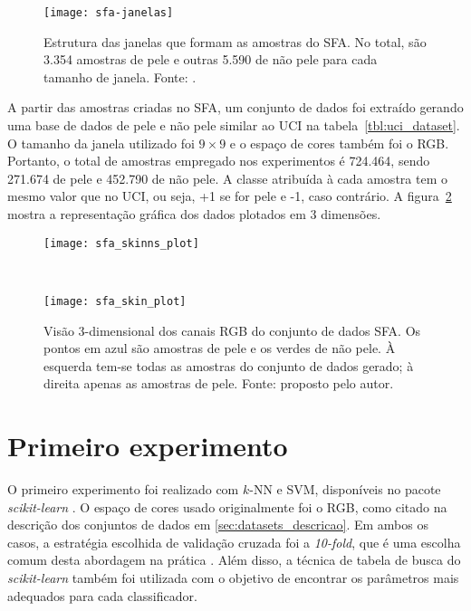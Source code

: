 \begin{figure}[h]
  \centering
  \texttt{[image: sfa-janelas]}
  \caption[Estrutura das janelas que formam as amostras do SFA]{Estrutura das janelas que formam as amostras do SFA. No total, são 3.354 amostras de pele e outras 5.590 de não pele para cada tamanho de janela. Fonte: \citet{sfa-skin-dataset:13}.}
  \label{fig:sfa_dataset_janelas}
\end{figure}

A partir das amostras criadas no SFA, um conjunto de dados foi extraído gerando uma base de dados de pele e não pele similar ao UCI na tabela~\ref{tbl:uci_dataset}. O tamanho da janela utilizado foi $9 \times 9$ e o espaço de cores também foi o RGB. Portanto, o total de amostras empregado nos experimentos é 724.464, sendo 271.674 de pele e 452.790 de não pele. A classe atribuída à cada amostra tem o mesmo valor que no UCI, ou seja, +1 se for pele e -1, caso contrário. A figura~\ref{fig:dataset_sfa} mostra a representação gráfica dos dados plotados em 3 dimensões.
\begin{figure}[h]
    \centering
    \begin{minipage}{0.45\textwidth}
        \texttt{[image: sfa\_skinns\_plot]}
    \end{minipage}
    ~ %
    \begin{minipage}{0.45\textwidth}
        \texttt{[image: sfa\_skin\_plot]}
    \end{minipage}
    \caption[Visão 3-dimensional dos canais RGB do conjunto de dados SFA]{Visão 3-dimensional dos canais RGB do conjunto de dados SFA. Os pontos em azul são amostras de pele e os verdes de não pele. À esquerda tem-se todas as amostras do conjunto de dados gerado; à direita apenas as amostras de pele. Fonte: proposto pelo autor.}
    \label{fig:dataset_sfa}
\end{figure}

\section{Primeiro experimento}
\label{sec:experimento_um}
O primeiro experimento foi realizado com $k$-NN e SVM, disponíveis no pacote \emph{scikit-learn} \citep{scikit-learn:11}. O espaço de cores usado originalmente foi o RGB, como citado na descrição dos conjuntos de dados em \ref{sec:datasets_descricao}. Em ambos os casos, a estratégia escolhida de validação cruzada foi a \emph{10-fold}, que é uma escolha comum desta abordagem na prática \citep{mostafa:12}. Além disso, a técnica de tabela de busca do \emph{scikit-learn} também foi utilizada com o objetivo de encontrar os parâmetros mais adequados para cada classificador.

